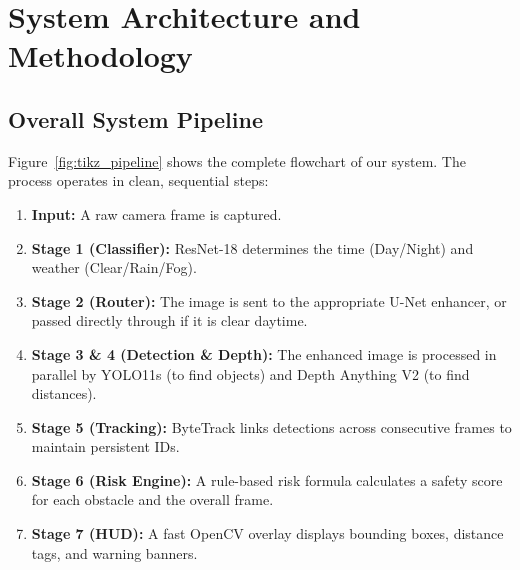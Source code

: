 \documentclass{article}
\begin{document}
\newpage
\section{System Architecture and Methodology}
\label{sec:methodology}

\subsection{Overall System Pipeline}
Figure~\ref{fig:tikz_pipeline} shows the complete flowchart of our system. The process operates in clean, sequential steps:
\begin{enumerate}
    \item \textbf{Input:} A raw camera frame is captured.
    \item \textbf{Stage 1 (Classifier):} ResNet-18 determines the time (Day/Night) and weather (Clear/Rain/Fog).
    \item \textbf{Stage 2 (Router):} The image is sent to the appropriate U-Net enhancer, or passed directly through if it is clear daytime.
    \item \textbf{Stage 3 \& 4 (Detection \& Depth):} The enhanced image is processed in parallel by YOLO11s (to find objects) and Depth Anything V2 (to find distances).
    \item \textbf{Stage 5 (Tracking):} ByteTrack links detections across consecutive frames to maintain persistent IDs.
    \item \textbf{Stage 6 (Risk Engine):} A rule-based risk formula calculates a safety score for each obstacle and the overall frame.
    \item \textbf{Stage 7 (HUD):} A fast OpenCV overlay displays bounding boxes, distance tags, and warning banners.
\end{enumerate}
\end{document}
